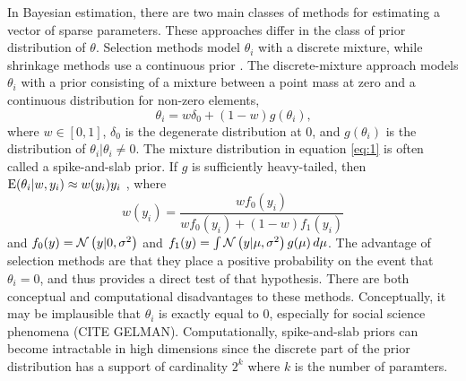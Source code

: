 \documentclass{article}
\begin{document}
In Bayesian estimation, there are two main classes of methods for estimating a vector of sparse parameters.
These approaches differ in the class of prior distribution of $\theta$. 
Selection methods model $\theta_{i}$ with a discrete mixture, while shrinkage methods use a continuous prior \parencite[73]{CarvalhoPolsonScott2009}. 
The discrete-mixture approach models $\theta_{i}$ with a prior consisting of a mixture between a point mass at zero and a continuous distribution for non-zero elements,
\begin{equation}
  \label{eq:1}
  \theta_{i} = w \delta_{0} +  (1 - w) g(\theta_{i}) \text{,}
\end{equation}
where $w \in [0, 1]$, $\delta_{0}$ is the degenerate distribution at 0, and $g(\theta_{i})$ is the distribution of $\theta_{i} | \theta_{i} \neq 0$.
The mixture distribution in equation \eqref{eq:1} is often called a spike-and-slab prior.
If $g$ is sufficiently heavy-tailed, then $\operatorname{E}(\theta_{i} | w, y_{i}) \approx w(y_{i}) y_{i}$ \parencite{PolsonScott2010}, where 
\begin{equation}
  \label{eq:7}
  w(y_{i})  = \frac{w f_{0}(y_{i})}{w f_{0}(y_{i}) + (1 - w) f_{1}(y_{i})}
\end{equation}
and $f_{0}(y) = \mathcal{N}\left(y | 0, \sigma^{2}\right)$ and $f_{1}(y) = \int \mathcal{N}\left(y | \mu, \sigma^{2}\right) g(\mu) \,d \mu$.
The advantage of selection methods are that they place a positive probability on the event that $\theta_{i} = 0$, and thus provides a direct test of that hypothesis.
There are both conceptual and computational disadvantages to these methods.
Conceptually, it may be implausible that $\theta_{i}$ is exactly equal to 0, especially for social science phenomena (CITE GELMAN).
Computationally, spike-and-slab priors can become intractable in high dimensions since the discrete part of the prior distribution has a support of cardinality $2^{k}$ where $k$ is the number of paramters.
\end{document}
